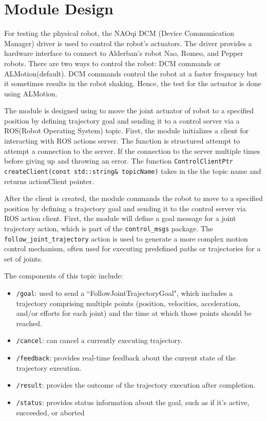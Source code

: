 \documentclass{CSSRforAfrica}
\begin{document}
\newpage

\section{Module Design}

For testing the physical robot, the NAOqi DCM (Device Communication Manager) driver is used to control the robot's actuators. 
The driver provides a hardware interface to connect to Alderban's robot Nao, Romeo, and Pepper robots. There are two ways to 
control the robot: DCM commands or ALMotion(default). DCM commands control the robot at a faster frequency but it sometimes 
results in the robot shaking. Hence, the test for the actuator is done using ALMotion. 

The module is designed using to move the joint actuator of  robot to a specified position by defining trajectory goal and sending it 
to a control server via a ROS(Robot Operating System) topic. First, the module initializes a client for interacting 
with ROS actions server. The function is structured attempt to attempt a connection to the server. If the connection 
to the server multiple times before giving up and throwing an error. The function \texttt{ControlClientPtr 
createClient(const std::string\& topicName)} takes in the the topic name and returns actionClient pointer. 

After the client is created, the module commands the robot to move to a specified position by defining a trajectory
goal and sending it to the control server via ROS action client. First, the module will define a goal message for 
a joint trajectory action, which is part of the \texttt{control\_msgs} package. The \texttt{follow\_joint\_trajectory}
action is used to generate a more complex motion control mechanism, often used for executing predefined paths or
trajectories for a set of joints. 

The components of this topic include: 
\begin{itemize}
    \item \texttt{/goal}: used to send a ``FollowJointTrajectoryGoal", which includes a trajectory comprising multiple points (position, 
    velocities, acceleration, and/or efforts for each joint) and the time at which those points should be reached.
    \item \texttt{/cancel}: can cancel a currently executing trajectory.
    \item \texttt{/feedback}: provides real-time feedback about the current state of the trajectory 
    execution. 
    \item \texttt{/result}: provides the outcome of the trajectory execution after completion.
    \item \texttt{/status}: provides status information about the goal, such as if it's active, succeeded, or aborted
\end{itemize} 
\end{document}

